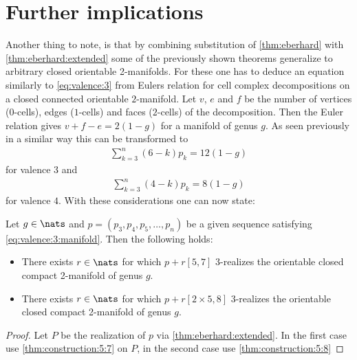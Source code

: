 \section{Further implications}

Another thing to note, is that by combining substitution of \autoref{thm:eberhard} with \autoref{thm:eberhard:extended} some of the previously shown theorems generalize to arbitrary closed orientable 2-manifolds. For these one has to deduce an equation similarly to  \autoref{eq:valence:3} from Eulers relation for cell complex decompositions on a closed connected orientable $2$-manifold. Let $v$, $e$ and $f$ be the number of vertices ($0$-cells), edges ($1$-cells) and faces ($2$-cells) of the decomposition. Then the Euler relation gives $v + f - e = 2(1-g)$ for a manifold of genus $g$. As seen previously in a similar way this can be transformed to
\begin{align}
  \sum_{k=3}^n \left(6 - k \right) p_k = 12(1-g) \label{eq:valence:3:manifold}
\end{align}
for valence $3$ and 
\begin{align}
  \sum_{k=3}^n \left(4 - k \right) p_k = 8(1-g)  \label{eq:valence:4:manifold}
\end{align}
for valence $4$. With these considerations one can now state:
\begin{theorem}
  Let $g \in \nats$ and $p = (p_3, p_4, p_5, \dots, p_n)$ be a given sequence satisfying \autoref{eq:valence:3:manifold}. Then the following holds:
  \begin{itemize}
  \item There exists $r \in \nats$ for which $p + r [5, 7]$ $3$-realizes the orientable closed compact 2-manifold of genus $g$.
  \item There exists $r \in \nats$ for which $p + r [2 \times 5, 8]$ $3$-realizes the orientable closed compact 2-manifold of genus $g$.
  \end{itemize}
  \begin{proof}
    Let $P$ be the realization of $p$ via \autoref{thm:eberhard:extended}. In the first case use \autoref{thm:construction:5:7} on $P$, in the second case use \autoref{thm:construction:5:8}
  \end{proof}
\end{theorem}

